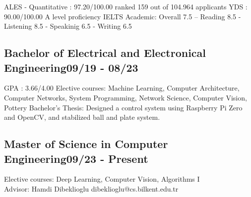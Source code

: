 \vspace*{10pt}
ALES - Quantitative : 97.20/100.00 \hfill ranked 159 out of 104.964 applicants \newline
YDS : 90.00/100.00 \hfill A level proficiency \newline
IELTS Academic: Overall 7.5 -- Reading 8.5 - Listening 8.5 - Speakinig 6.5 - Writing 6.5 \newline

\subsection{{Bachelor of Electrical and Electronical Engineering}\hfill 09/19 - 08/23}
\vspace*{5pt}
GPA : 3.66/4.00 \newline
Elective courses: Machine Learning, Computer Architecture, Computer Networks, System Programming, Network Science, Computer Vision, Pottery \newline
Bachelor's Thesis: Designed a control system using Raspberry Pi Zero and OpenCV, and stabilized ball and plate system.

\vspace*{6pt}

\subsection{{Master of Science in Computer Engineering}\hfill 09/23 - Present}
Elective courses: Deep Learning, Computer Vision, Algorithms I\\
\vspace*{5pt}
Advisor: Hamdi Dibeklioglu \hfill dibeklioglu@cs.bilkent.edu.tr\newline


